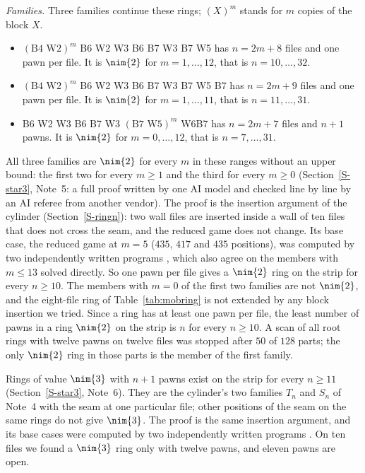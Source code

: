 \emph{Families.} Three families continue these rings; $(X)^m$ stands for $m$ copies of the block $X$.
\begin{itemize}
\item $(\text{B4 W2})^m$ B6 W2 W3 B6 B7 W3 B7 W5 has $n=2m+8$ files and one pawn per file. It is $\nim{2}$ for
  $m=1,\dots,12$, that is $n=10,\dots,32$.
\item $(\text{B4 W2})^m$ B6 W2 W3 B6 B7 W3 B7 W5 B7 has $n=2m+9$ files and one pawn per file. It is $\nim{2}$ for
  $m=1,\dots,11$, that is $n=11,\dots,31$.
\item B6 W2 W3 B6 B7 W3 $(\text{B7 W5})^m$ W6B7 has $n=2m+7$ files and $n+1$ pawns. It is $\nim{2}$ for
  $m=0,\dots,12$, that is $n=7,\dots,31$.
\end{itemize}
All three families are $\nim{2}$ for every $m$ in these ranges without an upper bound: the first two for every
$m\ge1$ and the third for every $m\ge0$  (Section~\ref{S-star3}, Note~5: a full proof written by one AI model and checked line by line by an AI referee from another vendor). The proof is the insertion
argument of the cylinder (Section~\ref{S-ringn}): two wall files are inserted inside a wall of ten files that does not cross the seam,
and the reduced game does not change. Its base case, the reduced game at $m=5$ ($435$, $417$ and $435$ positions),
was computed by two independently written programs , which also agree on the members with $m\le13$ solved directly. So one pawn per file
gives a $\nim{2}$ ring on the strip for every $n\ge10$. The members with $m=0$ of the first two
families are not $\nim{2}$, and the eight-file ring of Table~\ref{tab:mobring} is not extended by any block
insertion we tried. Since a ring has at least one pawn per file, the least number of pawns in a ring $\nim{2}$ on the
strip is $n$ for every $n\ge10$. A scan of all root rings with twelve pawns on twelve files was stopped after $50$ of
$128$ parts; the only $\nim{2}$ ring in those parts is the member of the first family.

Rings of value $\nim{3}$ with $n+1$ pawns exist on the strip for every $n\ge11$  (Section~\ref{S-star3}, Note~6). They are the cylinder's two families $T_n$ and $S_n$ of Note~4 with the seam at one particular file; other positions of the seam on the same rings do not give $\nim{3}$. The proof is the same insertion argument, and its base cases were computed by two independently written programs . On ten files we found a $\nim{3}$ ring only with twelve pawns, and eleven pawns are open.

